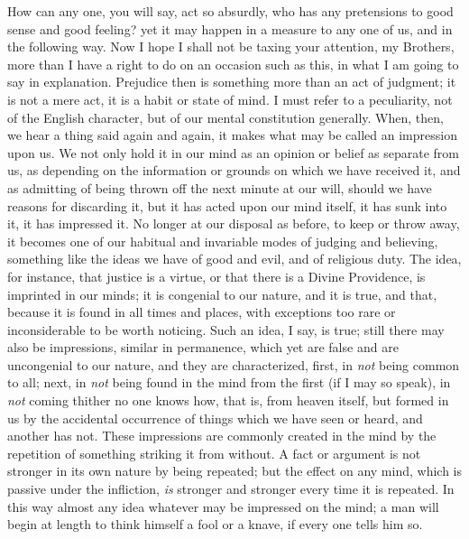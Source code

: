 How can any one, you will say, act so absurdly, who
has any pretensions to good sense and good feeling? yet
it may happen in a measure to any one of us, and in the
following way. Now I hope I shall not be taxing your
attention, my Brothers, more than I have a right to do on
an occasion such as this, in what I am going to say in
explanation. Prejudice then is something more than an act
of judgment; it is not a mere act, it is a habit or state
of mind. I must refer to a peculiarity, not of the
English character, but of our mental constitution
generally. When, then, we hear a thing said again and
again, it makes what may be called an impression upon us.
We not only hold it in our mind as an opinion or belief
as separate from us, as depending on the information or
grounds on which we have received it, and as admitting of
being thrown off the next minute at our will, should we
have reasons for discarding it, but it has acted upon our
mind itself, it has sunk into it, it has impressed it. No
longer at our disposal as before, to keep or throw away,
it becomes one of our habitual and invariable modes of
judging and believing, something like the ideas we have
of good and evil, and of religious duty. The idea, for
instance, that justice is a virtue, or that there is a
Divine Providence, is imprinted in our minds; it is
congenial to our nature, and it is true, and that,
because it is found in all times and places, with
exceptions too rare or inconsiderable to be worth
noticing. Such an idea, I say, is true; still there may
also be impressions, similar in permanence, which yet are
false and are uncongenial to our nature, and they are
characterized, first, in \emph{not} being common to
all; next, in \emph{not} being found in the mind from
the first (if I may so speak), in \emph{not} coming
thither no one knows how, that is, from heaven itself,
but formed in us by the accidental occurrence of things
which we have seen or heard, and another has not. These
impressions are commonly created in the mind by the
repetition of something striking it from without. A fact
or argument is not stronger in its own nature by being
repeated; but the effect on any mind, which is passive
under the infliction, \emph{is} stronger and stronger
every time it is repeated. In this way almost any idea
whatever may be impressed on the mind; a man will begin
at length to think himself a fool or a knave, if every
one tells him so.

